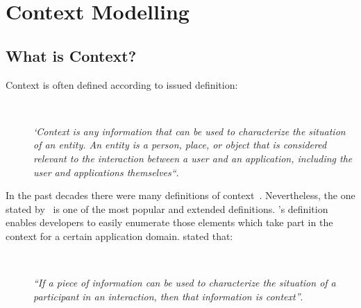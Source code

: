 \section{Context Modelling}
\label{sec:context}
\subsection{What is Context?}
\label{sec:context_definition}

Context is often defined according to \citeauthor{dey_understanding_2001}
issued definition:

\begin{description}
  \item[] \hfill \\
  \begin{mdframed}[hidealllines=true,backgroundcolor=gray!20]
  \textit{`Context is any information that can be used to characterize the situation
  of an entity. An entity is a person, place, or object that is considered 
  relevant to the interaction between a user and an application, including the 
  user and applications themselves``}.
  \end{mdframed}
\end{description}

In the past decades there were many definitions of context~\citep{adomavicius_context_aware_2011}.
Nevertheless, the one stated by~\citet{dey_understanding_2001} is one of the most
popular and extended definitions. \citeauthor{dey_understanding_2001}'s 
definition enables developers to easily enumerate those elements which take part 
in the context for a certain application domain. \citeauthor{dey_understanding_2001} stated that:

\begin{description}
  \item[] \hfill \\
  \begin{mdframed}[hidealllines=true,backgroundcolor=gray!20]
  \textit{``If a piece of information can be used to characterize the situation 
  of a participant in an interaction, then that information is context''}.
  \end{mdframed}
\end{description}

